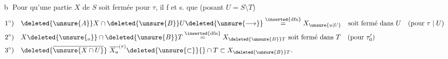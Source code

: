 \textcircled{b} Pour qu'une partie $X$ de $S$ soit fermée pour $\tau$, il f et s. que (posant $U=S\setminus T$)
\[
\begin{aligned}
1^\circ)\quad &\deleted{\unsure{A}}X\cap \deleted{\unsure{B}}U\deleted{\unsure{\longrightarrow}}\overset{\inserted{\mathrm{dfn}}}{=}X_{\unsure{u|U}}\quad\text{soit fermé dans }U\quad(\text{pour }\tau\mid U)\\
2^\circ)\quad &X\deleted{\unsure{_a}}\cap\deleted{\unsure{B}}T\overset{\inserted{\mathrm{dfn}}}{=}X_{\deleted{\unsure{B}}T}\ \text{soit fermé dans }T\quad(\text{pour }\tau'_0)\\
3^\circ)\quad &\deleted{\overline{\unsure{X\cap U}}}\ \overline{X_u}^{(\tau)}\deleted{\unsure{\subset}}{}\cap T\subset X_{\deleted{\unsure{B}}T}.
\end{aligned}
\]
